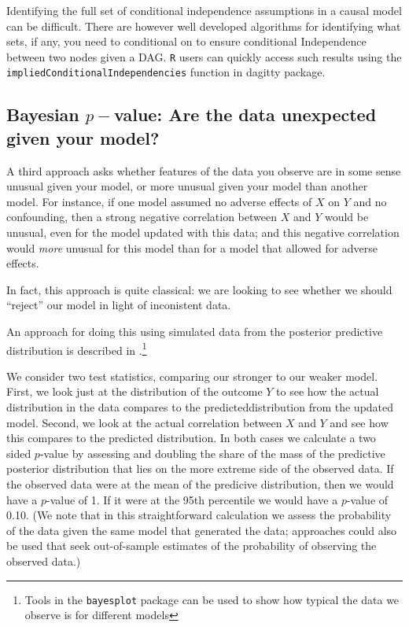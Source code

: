 \documentclass[
  12pt,
]{book}
\begin{document}
Identifying the full set of conditional independence assumptions in a causal model can be difficult. There are however well developed algorithms for identifying what sets, if any, you need to conditional on to ensure conditional Independence between two nodes given a DAG. \texttt{R} users can quickly access such results using the \texttt{impliedConditionalIndependencies} function in dagitty package.

\hypertarget{bayesian-p-value-are-the-data-unexpected-given-your-model}{%
\subsection{\texorpdfstring{Bayesian \(p-\)value: Are the data unexpected given your model?}{Bayesian p-value: Are the data unexpected given your model?}}\label{bayesian-p-value-are-the-data-unexpected-given-your-model}}

A third approach asks whether features of the data you observe are in some sense unusual given your model, or more unusual given your model than another model. For instance, if one model assumed no adverse effects of \(X\) on \(Y\) and no confounding, then a strong negative correlation between \(X\) and \(Y\) would be unusual, even for the model updated with this data; and this negative correlation would \emph{more} unusual for this model than for a model that allowed for adverse effects.

In fact, this approach is quite classical: we are looking to see whether we should ``reject'' our model in light of inconistent data.

An approach for doing this using simulated data from the posterior predictive distribution is described in \citet{gabry2019visualization}.\footnote{Tools in the \texttt{bayesplot} package can be used to show how typical the data we observe is for different models}

We consider two test statistics, comparing our stronger to our weaker model. First, we look just at the distribution of the outcome \(Y\) to see how the actual distribution in the data compares to the predicteddistribution from the updated model. Second, we look at the actual correlation between \(X\) and \(Y\) and see how this compares to the predicted distribution. In both cases we calculate a two sided \(p\)-value by assessing and doubling the share of the mass of the predictive posterior distribution that lies on the more extreme side of the observed data. If the observed data were at the mean of the predicive distribution, then we would have a \(p\)-value of 1. If it were at the 95th percentile we would have a \(p\)-value of 0.10. (We note that in this straightforward calculation we assess the probability of the data given the same model that generated the data; approaches could also be used that seek out-of-sample estimates of the probability of observing the observed data.)
\end{document}
